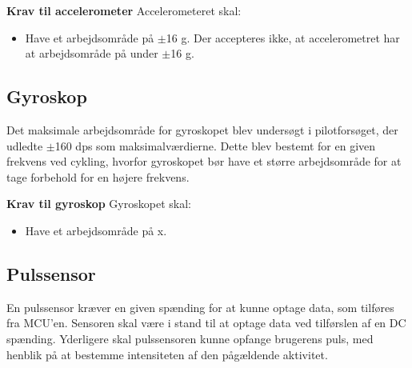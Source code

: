 \textbf{Krav til accelerometer} \newline 
Accelerometeret skal:
\begin{itemize}
\item Have et arbejdsområde på $\pm$16 g. Der accepteres ikke, at accelerometret har at arbejdsområde på under $\pm$16 g.
\end{itemize}

\subsection{Gyroskop} 
Det maksimale arbejdsområde for gyroskopet blev undersøgt i pilotforsøget, der udledte $\pm$160 dps som maksimalværdierne. Dette blev bestemt for en given frekvens ved cykling, hvorfor gyroskopet bør have et større arbejdsområde for at tage forbehold for en højere frekvens. %

\textbf{Krav til gyroskop} \newline
Gyroskopet skal:
\begin{itemize}
\item Have et arbejdsområde på x.
\end{itemize}

\subsection{Pulssensor}
En pulssensor kræver en given spænding for at kunne optage data, som tilføres fra MCU'en. Sensoren skal være i stand til at optage data ved tilførslen af en DC spænding. %
Yderligere skal pulssensoren kunne opfange brugerens puls, med henblik på at bestemme intensiteten af den pågældende aktivitet.


